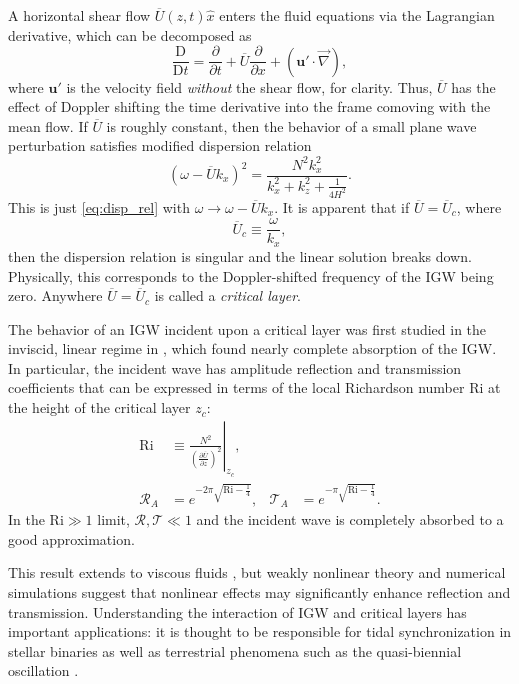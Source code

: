 \documentclass[
        fleqn,
        usenatbib,
        referee,
    ]{mnras}
\newcommand*{\pd}[2]{\frac{\partial#1}{\partial#2}}
\newcommand*{\md}[2]{\frac{\mathrm{D}#1}{\mathrm{D}#2}}
\newcommand*{\at}[1]{\left.#1\right|}
\newcommand*{\p}[1]{\left(#1\right)}
\newcommand*{\bm}[1]{\mathbf{#1}}
\begin{document}
A horizontal shear flow $\overline{U}(z, t)\hat{x}$ enters the fluid equations
via the Lagrangian derivative, which can be decomposed as
\begin{equation}
    \md{}{t} = \pd{}{t} + \overline{U} \pd{}{x} + \p{\bm{u}' \cdot \vec{\nabla}},
\end{equation}
where $\bm{u}'$ is the velocity field \emph{without} the shear flow, for
clarity. Thus, $\overline{U}$ has the effect of Doppler shifting the time
derivative into the frame comoving with the mean flow. If $\overline{U}$ is
roughly constant, then the behavior of a small plane wave perturbation satisfies
modified dispersion relation
\begin{equation}
    \p{\omega - \overline{U}k_x}^2 =
        \frac{N^2k_{x}^2}{k_{x}^2 + k_{z}^2 + \frac{1}{4H^2}}.
        \label{eq:disp_rel_U}
\end{equation}
This is just \autoref{eq:disp_rel} with $\omega \to \omega - \overline{U}k_x$.
It is apparent that if $\overline{U} = \overline{U}_c$, where
\begin{equation}
    \overline{U}_c \equiv \frac{\omega}{k_x},
\end{equation}
then the dispersion relation is singular and the linear solution breaks down.
Physically, this corresponds to the Doppler-shifted frequency of the IGW being
zero. Anywhere $\overline{U} = \overline{U}_c$ is called a \emph{critical
layer}.

The behavior of an IGW incident upon a critical layer was first studied in the
inviscid, linear regime in \citealp{booker_bretherton}, which found nearly
complete absorption of the IGW\@. In particular, the incident wave has amplitude
reflection and transmission coefficients that can be expressed in terms of the
local Richardson number Ri at the height of the critical layer $z_c$:
\begin{align}
    \mathrm{Ri} &\equiv \at{\frac{N^2}{\p{\pd{\overline{U}}{z}}^2}}_{z_c},
        \label{eq:ri_def}\\
    \mathcal{R}_A &= e^{-2\pi \sqrt{\mathrm{Ri} - \frac{1}{4}}}, &
    \mathcal{T}_A &= e^{-\pi \sqrt{\mathrm{Ri} - \frac{1}{4}}}.
        \label{eq:crit_coeffs}
\end{align}
In the $\mathrm{Ri} \gg 1$ limit, $\mathcal{R}, \mathcal{T} \ll 1$
and the incident wave is completely absorbed to a good approximation.

This result extends to viscous fluids \citep{hazel}, but weakly nonlinear theory
\citep{brown_stewartson} and numerical simulations \citep{winters1994} suggest
that nonlinear effects may significantly enhance reflection and transmission.
Understanding the interaction of IGW and critical layers has important
applications: it is thought to be responsible for tidal synchronization in
stellar binaries \citep{zahn75,gn89} as well as terrestrial phenomena such as
the quasi-biennial oscillation \citep{lindzen_qbo}.
\end{document}
